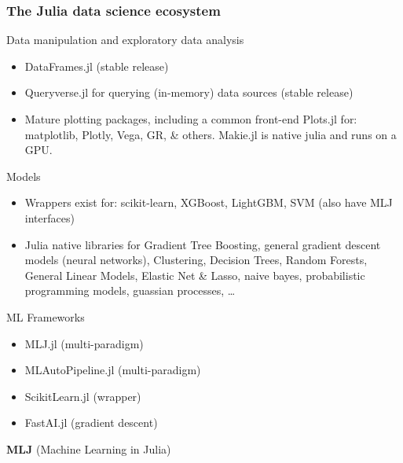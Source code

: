 \documentclass[t]{beamer}
\newcommand\df{\bf\color{Maroon}}
\begin{document}
\begin{frame}
  \frametitle{The Julia data science ecosystem}
  \begin{block}{Data manipulation and exploratory data analysis}
  \begin{itemize}
      \item DataFrames.jl (stable release)
      \item Queryverse.jl for querying (in-memory) data sources (stable release)
      \item Mature plotting packages, including a common front-end Plots.jl for:
        matplotlib, Plotly, Vega, GR, \& others.  Makie.jl is native julia and
        runs on a GPU.\pause
  \end{itemize}
\end{block}
\end{frame}
\begin{frame}
  \begin{block}{Models}
  \begin{itemize}
     \item Wrappers exist for: scikit-learn, XGBoost, LightGBM, SVM (also have MLJ interfaces)\pause
     \item Julia native libraries for Gradient Tree Boosting, general gradient descent models (neural networks),
         Clustering, Decision Trees, Random Forests, General Linear Models, Elastic Net \& Lasso, naive bayes,
         probabilistic programming models, guassian processes, \ldots\pause
  \end{itemize}
  \end{block}
  \begin{block}{ML Frameworks}
  \begin{itemize}
     \item MLJ.jl (multi-paradigm)
     \item MLAutoPipeline.jl (multi-paradigm)
     \item ScikitLearn.jl (wrapper)
     \item FastAI.jl (gradient descent)
  \end{itemize}
  \end{block}
\end{frame}

\begin{frame}
  \mbox{}
  \vspace{4\baselineskip}
  \begin{center}
    \large {\df MLJ} (Machine Learning in Julia)
  \end{center}
\end{frame}
\end{document}
